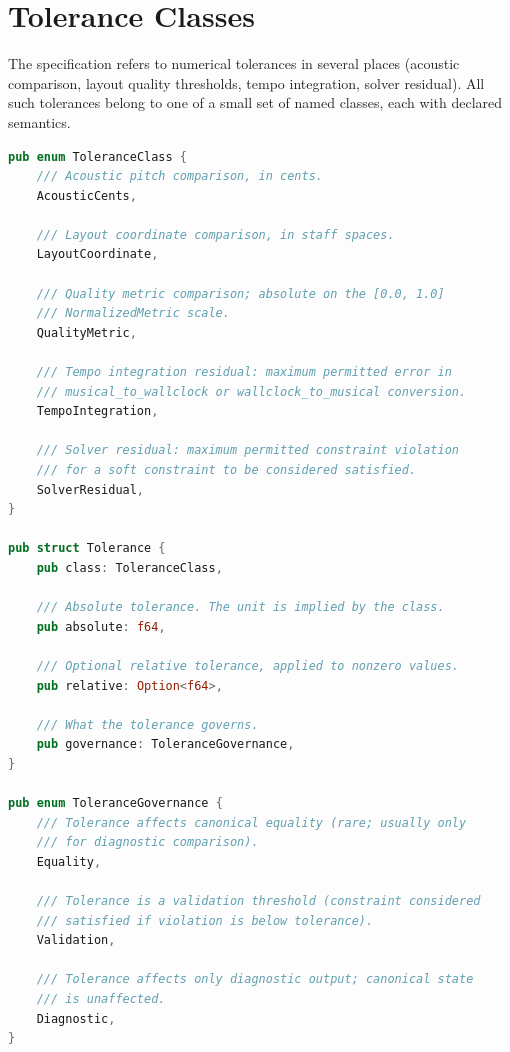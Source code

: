 \documentclass[11pt,letterpaper]{report}
\begin{document}
\section{Tolerance Classes}
\label{sec:det:tolerances}

The specification refers to numerical tolerances in several
places (acoustic comparison, layout quality thresholds, tempo
integration, solver residual). All such tolerances belong to one
of a small set of named classes, each with declared semantics.

\begin{lstlisting}[language=Rust]
pub enum ToleranceClass {
    /// Acoustic pitch comparison, in cents.
    AcousticCents,

    /// Layout coordinate comparison, in staff spaces.
    LayoutCoordinate,

    /// Quality metric comparison; absolute on the [0.0, 1.0]
    /// NormalizedMetric scale.
    QualityMetric,

    /// Tempo integration residual: maximum permitted error in
    /// musical_to_wallclock or wallclock_to_musical conversion.
    TempoIntegration,

    /// Solver residual: maximum permitted constraint violation
    /// for a soft constraint to be considered satisfied.
    SolverResidual,
}

pub struct Tolerance {
    pub class: ToleranceClass,

    /// Absolute tolerance. The unit is implied by the class.
    pub absolute: f64,

    /// Optional relative tolerance, applied to nonzero values.
    pub relative: Option<f64>,

    /// What the tolerance governs.
    pub governance: ToleranceGovernance,
}

pub enum ToleranceGovernance {
    /// Tolerance affects canonical equality (rare; usually only
    /// for diagnostic comparison).
    Equality,

    /// Tolerance is a validation threshold (constraint considered
    /// satisfied if violation is below tolerance).
    Validation,

    /// Tolerance affects only diagnostic output; canonical state
    /// is unaffected.
    Diagnostic,
}
\end{lstlisting}
\end{document}
